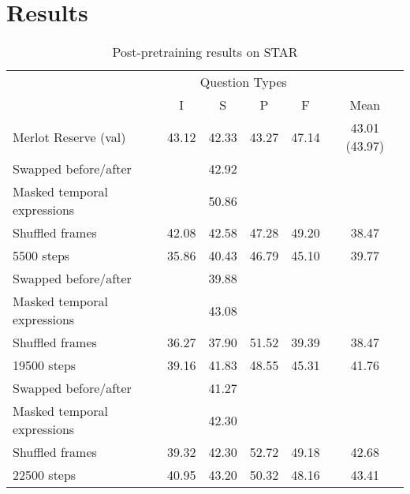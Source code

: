 \chapter{Results}
\label{chap:results}

\begin{table}[htpb]
	\centering
	\caption{Post-pretraining results on STAR}
	\label{tab:label}
	\begin{tabular}{lccccc}
        \toprule
        \multicolumn{1}{c}{}        & \multicolumn{4}{c}{Question Types}        & \multicolumn{1}{c}{} \\
                                      \cmidrule(){2-5}
                                    & I           & S        & P          & F           & Mean \\
        \cmidrule(r){1-1}             \cmidrule(){2-5}                          \cmidrule(l){6-6}
        Merlot Reserve (val)        & 43.12       & 42.33    & 43.27      & 47.14       & 43.01 (43.97) \\
		Swapped before/after		&			  & 42.92    &			  &				& \\
		Masked temporal expressions &			  & 50.86    &			  &				& \\
		Shuffled frames				& 42.08		  & 42.58	 & 47.28	  & 49.20		& 38.47 \\
        \cmidrule(r){1-1}             \cmidrule(){2-5}                          \cmidrule(l){6-6}
		5500 steps					& 35.86		  & 40.43	 & 46.79	  & 45.10		& 39.77 \\
		Swapped before/after		&			  & 39.88	 &			  &				& \\
		Masked temporal expressions &			  & 43.08    &			  &				& \\
		Shuffled frames				& 36.27		  & 37.90	 & 51.52	  & 39.39		& 38.47 \\
        \cmidrule(r){1-1}             \cmidrule(){2-5}                          \cmidrule(l){6-6}
		19500 steps					& 39.16		  & 41.83    & 48.55	  & 45.31		& 41.76 \\
		Swapped before/after		&			  & 41.27	 &			  &				& \\
		Masked temporal expressions &			  & 42.30    &			  &				& \\
		Shuffled frames				& 39.32		  & 42.30	 & 52.72	  & 49.18		& 42.68 \\
        \cmidrule(r){1-1}             \cmidrule(){2-5}                          \cmidrule(l){6-6}
		22500 steps					& 40.95		  & 43.20    & 50.32	  & 48.16		& 43.41 \\

\end{tabular}
\end{table}

